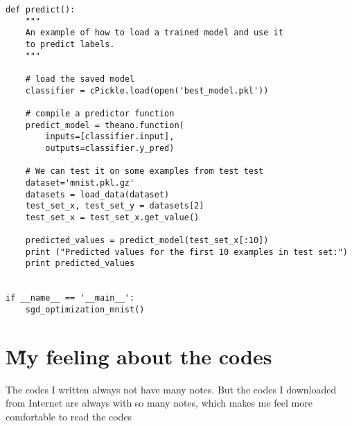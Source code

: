 \documentclass[12pt]{article}
\begin{document}
\begin{lstlisting}
def predict():
    """
    An example of how to load a trained model and use it
    to predict labels.
    """

    # load the saved model
    classifier = cPickle.load(open('best_model.pkl'))

    # compile a predictor function
    predict_model = theano.function(
        inputs=[classifier.input],
        outputs=classifier.y_pred)

    # We can test it on some examples from test test
    dataset='mnist.pkl.gz'
    datasets = load_data(dataset)
    test_set_x, test_set_y = datasets[2]
    test_set_x = test_set_x.get_value()

    predicted_values = predict_model(test_set_x[:10])
    print ("Predicted values for the first 10 examples in test set:")
    print predicted_values


if __name__ == '__main__':
    sgd_optimization_mnist()

\end{lstlisting}

\section{\H My feeling about the codes}
The codes I written always not have many notes. But the codes I downloaded from Internet are always with so many notes, which makes me feel more comfortable to read the codes




\end{document}
